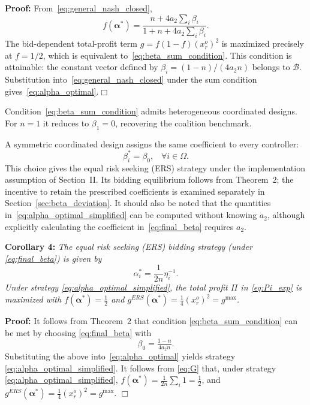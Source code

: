 \documentclass[journal]{IEEEtran}
\begin{document}
\noindent\textbf{Proof:} From~\eqref{eq:general_nash_closed},
\begin{equation}
f(\boldsymbol\alpha^*)
=\frac{n+4a_2\sum_i\beta_i}{1+n+4a_2\sum_i\beta_i}.
\label{eq:design_aggregate}
\end{equation}
The bid-dependent total-profit term $g=f(1-f)(x_r^o)^2$ is maximized precisely at $f=1/2$, which is equivalent to~\eqref{eq:beta_sum_condition}. This condition is attainable: the constant vector defined by $\beta_i=(1-n)/(4a_2n)$ belongs to $\mathcal B$. Substitution into~\eqref{eq:general_nash_closed} under the sum condition gives~\eqref{eq:alpha_optimal}.\hfill$\Box$

Condition~\eqref{eq:beta_sum_condition} admits heterogeneous coordinated designs. For $n=1$ it reduces to $\beta_1=0$, recovering the coalition benchmark.

A symmetric coordinated design assigns the same coefficient to every controller:
\begin{equation}
    \beta_i^*=\beta_0, \;\;\; \forall i\in\Omega. \label{eq:final_beta}
\end{equation}   
This choice gives the equal risk seeking (ERS) strategy under the implementation assumption of Section~II. Its bidding equilibrium follows from Theorem~2; the incentive to retain the prescribed coefficients is examined separately in Section~\ref{sec:beta_deviation}. It should also be noted that the quantities in~\eqref{eq:alpha_optimal_simplified} can be computed without knowing $a_2$, although explicitly calculating the coefficient in~\eqref{eq:final_beta} requires $a_2$.

\noindent \textbf{Corollary 4:} {\it The equal risk seeking (ERS) bidding strategy (under \eqref{eq:final_beta}) is given by
\begin{equation}
    \alpha_i^* = \frac{1}{2n}\eta_i^{-1}. \label{eq:alpha_optimal_simplified}
\end{equation}
Under strategy \eqref{eq:alpha_optimal_simplified}, the total profit $\Pi$ in \eqref{eq:Pi_exp} is maximized with $f(\boldsymbol{\alpha}^*)=\tfrac12$ and $g^{ERS}(\boldsymbol{\alpha}^*)=\tfrac{1}{4}(x_r^o)^2 =g^{\max}$.}

\noindent\textbf{Proof:} It follows from  Theorem~2 that condition \eqref{eq:beta_sum_condition} can be met by choosing \eqref{eq:final_beta} with   
\begin{equation}
\beta_0= \tfrac{1-n}{4a_2n}.  \label{eq:beta_optimal_simplified}
\end{equation}
Substituting the above into~\eqref{eq:alpha_optimal} yields strategy \eqref{eq:alpha_optimal_simplified}. It follows from \eqref{eq:G} that, under strategy \eqref{eq:alpha_optimal_simplified},
$f(\boldsymbol{\alpha}^*)=\tfrac{1}{2n}\sum_i 1=\tfrac{1}{2}$, and
$g^{ERS}(\boldsymbol{\alpha}^*)=\frac{1}{4}(x_r^o)^2=g^{\max}$. \hfill $\Box$
\end{document}
